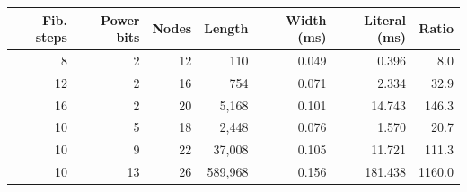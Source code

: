 \begin{tabular}{rrrrrrr}
\toprule
Fib. steps & Power bits & Nodes & Length & Width (ms) & Literal (ms) & Ratio \\
\midrule
8 & 2 & 12 & 110 & 0.049 & 0.396 & 8.0\\
12 & 2 & 16 & 754 & 0.071 & 2.334 & 32.9\\
16 & 2 & 20 & 5,168 & 0.101 & 14.743 & 146.3\\
10 & 5 & 18 & 2,448 & 0.076 & 1.570 & 20.7\\
10 & 9 & 22 & 37,008 & 0.105 & 11.721 & 111.3\\
10 & 13 & 26 & 589,968 & 0.156 & 181.438 & 1160.0\\
\bottomrule
\end{tabular}
